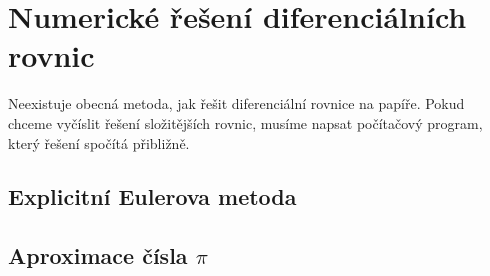 \chapter{Numerické řešení diferenciálních rovnic}
Neexistuje obecná metoda, jak řešit diferenciální rovnice na papíře. Pokud chceme vyčíslit řešení složitějších rovnic, musíme napsat počítačový program, který řešení spočítá přibližně.

\section{Explicitní Eulerova metoda}

\section{Aproximace čísla \texorpdfstring{$\pi$}{π}}

